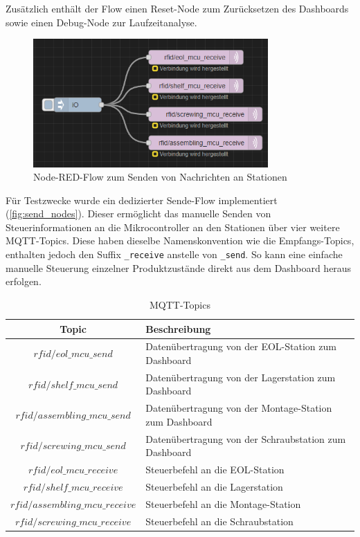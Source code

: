 Zusätzlich enthält der Flow einen Reset-Node zum Zurücksetzen des Dashboards sowie einen Debug-Node zur Laufzeitanalyse.

\begin{figure}[H]
	\centering
	\includegraphics[width=0.8\textwidth]{images/node-red-flow-send.png}
	\caption{Node-RED-Flow zum Senden von Nachrichten an Stationen}
	\label{fig:send_nodes}
\end{figure}

Für Testzwecke wurde ein dedizierter Sende-Flow implementiert (\autoref{fig:send_nodes}). Dieser ermöglicht das manuelle Senden von Steuerinformationen an die Mikrocontroller an den Stationen über vier weitere MQTT-Topics. Diese haben dieselbe Namenskonvention wie die Empfangs-Topics, enthalten jedoch den Suffix \texttt{\_receive} anstelle von \texttt{\_send}. So kann eine einfache manuelle Steuerung einzelner Produktzustände direkt aus dem Dashboard heraus erfolgen.

\begin{table}[H]
	\centering
	\caption{MQTT-Topics}
	\label{tab:mqtt_topics}
	\begin{tabular}{|c|l|}
		\hline
		\textbf{Topic} & \textbf{Beschreibung} \\ \hline
		$rfid/eol\_mcu\_send$ & Datenübertragung von der EOL-Station zum Dashboard \\ 
		$rfid/shelf\_mcu\_send$ & Datenübertragung von der Lagerstation zum Dashboard \\ 
		$rfid/assembling\_mcu\_send$ & Datenübertragung von der Montage-Station zum Dashboard \\ 
		$rfid/screwing\_mcu\_send$ & Datenübertragung von der Schraubstation zum Dashboard \\ \hline
		$rfid/eol\_mcu\_receive$ & Steuerbefehl an die EOL-Station \\ 
		$rfid/shelf\_mcu\_receive$ & Steuerbefehl an die Lagerstation \\ 
		$rfid/assembling\_mcu\_receive$ & Steuerbefehl an die Montage-Station \\ 
		$rfid/screwing\_mcu\_receive$ & Steuerbefehl an die Schraubstation \\ \hline
	\end{tabular}
\end{table}


